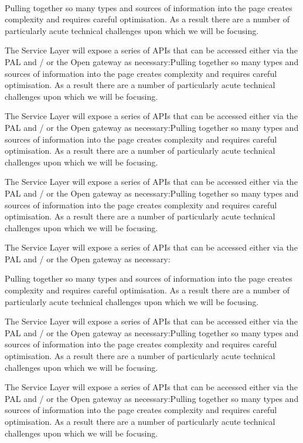 \documentclass[10pt, paper=A4, parskip=full,asymTypB, subject=afteropening, subject=left,Farrukh
               enlargefirstpage ]{scrlttr2}
\begin{document}
\begin{letter}{%
\tystrrecipient \\
\tystrrecipientaddress
}
Pulling together so many types and sources of information into the page creates complexity and requires careful optimisation. As a result there are a number of particularly acute technical challenges upon which we will be focusing.

The Service Layer will expose a series of APIs that can be accessed either via the PAL and / or the Open gateway as necessary:Pulling together so many types and sources of information into the page creates complexity and requires careful optimisation. As a result there are a number of particularly acute technical challenges upon which we will be focusing.

The Service Layer will expose a series of APIs that can be accessed either via the PAL and / or the Open gateway as necessary:Pulling together so many types and sources of information into the page creates complexity and requires careful optimisation. As a result there are a number of particularly acute technical challenges upon which we will be focusing.

The Service Layer will expose a series of APIs that can be accessed either via the PAL and / or the Open gateway as necessary:Pulling together so many types and sources of information into the page creates complexity and requires careful optimisation. As a result there are a number of particularly acute technical challenges upon which we will be focusing.

The Service Layer will expose a series of APIs that can be accessed either via the PAL and / or the Open gateway as necessary:

Pulling together so many types and sources of information into the page creates complexity and requires careful optimisation. As a result there are a number of particularly acute technical challenges upon which we will be focusing.

The Service Layer will expose a series of APIs that can be accessed either via the PAL and / or the Open gateway as necessary:Pulling together so many types and sources of information into the page creates complexity and requires careful optimisation. As a result there are a number of particularly acute technical challenges upon which we will be focusing.

The Service Layer will expose a series of APIs that can be accessed either via the PAL and / or the Open gateway as necessary:Pulling together so many types and sources of information into the page creates complexity and requires careful optimisation. As a result there are a number of particularly acute technical challenges upon which we will be focusing.


\end{letter}
\end{document}
